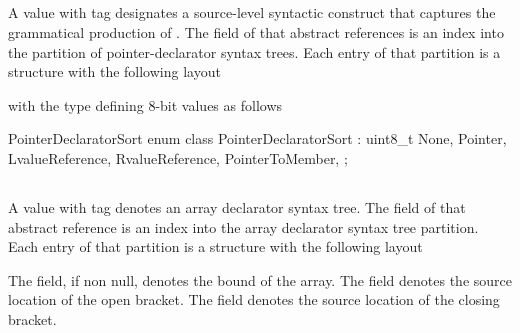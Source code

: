 

\subsection{}
\label{sec:ifc:SyntaxSort:PointerDeclarator} 

A  value with tag  designates a source-level syntactic construct
that captures the grammatical production of .
The  field of that abstract references is an index into the partition of pointer-declarator syntax trees.
Each entry of that partition is a structure with the following layout
%
\begin{figure}[H]
	\centering
	\label{fig:ifc:SyntaxSort:PointerDeclarator}
\end{figure}
%
with the type  defining $8$-bit values as follows
\begin{typedef}{PointerDeclaratorSort}{}
	enum class PointerDeclaratorSort : uint8_t {
		None,
		Pointer,
		LvalueReference,
		RvalueReference,
		PointerToMember,
	};
\end{typedef}


\subsection{}
\label{sec:ifc:SyntaxSort:ArrayDeclarator}

A  value with tag  denotes an array declarator syntax tree.
The  field of that abstract reference is an index into the array declarator syntax tree partition.
Each entry of that partition is a structure with the following layout
%
\begin{figure}[H]
	\centering
	\label{fig:ifc:SyntaxSort:ArrayDeclarator}
\end{figure}
%
The  field, if non null, denotes the bound of the array.
The  field denotes the source location of the open bracket.
The  field denotes the source location of the closing bracket.

